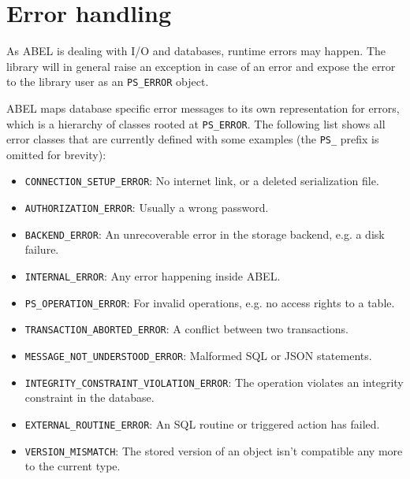 \documentclass[a4paper,12pt]{report}
\begin{document}
\chapter{Error handling}

As ABEL is dealing with I/O and databases, runtime errors may happen. 
The library will in general raise an exception in case of an error and expose the error to the library user as an \lstinline!PS_ERROR! object.
% 
% 
% 

ABEL maps database specific error messages to its own representation for errors, which is a hierarchy of classes rooted at \lstinline!PS_ERROR!.
The following list shows all error classes that are currently defined with some examples (the \lstinline!PS_! prefix is omitted for brevity):

\begin{itemize}
\item \lstinline!CONNECTION_SETUP_ERROR!: No internet link, or a deleted serialization file.
\item \lstinline!AUTHORIZATION_ERROR!: Usually a wrong password.
\item \lstinline!BACKEND_ERROR!: An unrecoverable error in the storage backend, e.g. a disk failure.
\item \lstinline!INTERNAL_ERROR!: Any error happening inside ABEL.
\item \lstinline!PS_OPERATION_ERROR!: For invalid operations, e.g. no access rights to a table.
\item \lstinline!TRANSACTION_ABORTED_ERROR!: A conflict between two transactions.
\item \lstinline!MESSAGE_NOT_UNDERSTOOD_ERROR!: Malformed SQL or JSON statements.
\item \lstinline!INTEGRITY_CONSTRAINT_VIOLATION_ERROR!: The operation violates an integrity constraint in the database.
\item \lstinline!EXTERNAL_ROUTINE_ERROR!: An SQL routine or triggered action has failed.
\item \lstinline!VERSION_MISMATCH!: The stored version of an object isn't compatible any more to the current type.
\end{itemize}
\end{document}

